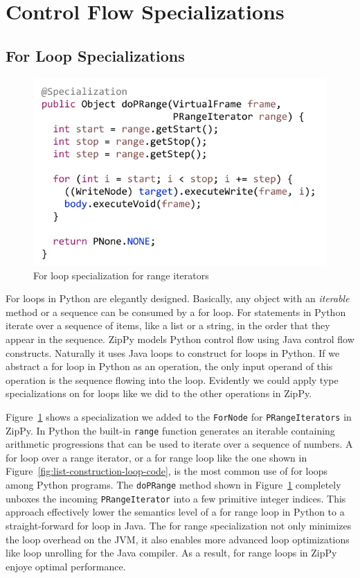 \section{Control Flow Specializations}

\subsection{For Loop Specializations}

\begin{figure}
\centering
\includegraphics[scale=.9]{figures/ch3-for-range-node-code.pdf}
\caption{For loop specialization for range iterators}
\label{fig:for-range-node}
\end{figure}

For loops in Python are elegantly designed.
Basically, any object with an \emph{iterable} method or a sequence can be consumed by a for loop.
For statements in Python iterate over a sequence of items, like a list or a string, in the order that they appear in the sequence.
ZipPy models Python control flow using Java control flow constructs.
Naturally it uses Java loops to construct for loops in Python.
If we abstract a for loop in Python as an operation, the only input operand of this operation is the sequence flowing into the loop.
Evidently we could apply type specializations on for loops like we did to the other operations in ZipPy.

Figure~\ref{fig:for-range-node} shows a specialization we added to the \texttt{ForNode} for \texttt{PRangeIterators} in ZipPy.
In Python the built-in \texttt{range} function generates an iterable containing arithmetic progressions that can be used to iterate over a sequence of numbers.
A for loop over a range iterator, or a for range loop like the one shown in Figure~\ref{fig:list-construction-loop-code}, is the most common use of for loops among Python programs.
The \texttt{doPRange} method shown in Figure~\ref{fig:for-range-node} completely unboxes the incoming \texttt{PRangeIterator} into a few primitive integer indices.
This approach effectively lower the semantics level of a for range loop in Python to a straight-forward for loop in Java.
The for range specialization not only minimizes the loop overhead on the JVM, it also enables more advanced loop optimizations like loop unrolling for the Java compiler.
As a result, for range loops in ZipPy enjoye optimal performance.

